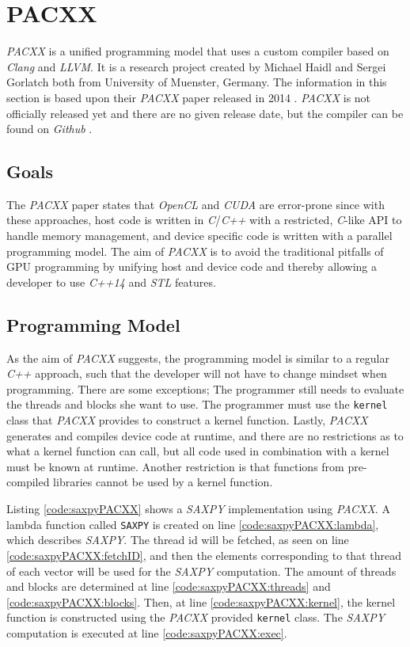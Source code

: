 \section{PACXX}
\textit{PACXX} is a unified programming model that uses a custom compiler based on \textit{Clang} and \textit{LLVM}. It is a research project created by Michael Haidl and Sergei Gorlatch both from University of Muenster, Germany. The information in this section is based upon their \textit{PACXX} paper released in 2014 \cite{pacxxPaper}. \textit{PACXX} is not officially released yet and there are no given release date, but the compiler can be found on \textit{Github} \cite{pacxxGithub}.

\subsection{Goals}
The \textit{PACXX} paper states that \textit{OpenCL} and \textit{CUDA} are error-prone since with these approaches, host code is written in \textit{C}/\textit{C++} with a restricted, \textit{C}-like API to handle memory management, and device specific code is written with a parallel programming model. The aim of \textit{PACXX} is to avoid the traditional pitfalls of GPU programming by unifying host and device code and thereby allowing a developer to use \textit{C++14} and \textit{STL} features.

\subsection{Programming Model}
As the aim of \textit{PACXX} suggests, the programming model is similar to a regular \textit{C++} approach, such that the developer will not have to change mindset when programming. There are some exceptions; The programmer still needs to evaluate the threads and blocks she want to use. The programmer must use the \texttt{kernel} class that \textit{PACXX} provides to construct a kernel function. Lastly, \textit{PACXX} generates and compiles device code at runtime, and there are no restrictions as to what a kernel function can call, but all code used in combination with a kernel must be known at runtime. Another restriction is that functions from pre-compiled libraries cannot be used by a kernel function.

Listing \ref{code:saxpyPACXX} shows a \textit{SAXPY} implementation using \textit{PACXX}. A lambda function called \texttt{SAXPY} is created on line \ref{code:saxpyPACXX:lambda}, which describes \textit{SAXPY}. The thread id will be fetched, as seen on line \ref{code:saxpyPACXX:fetchID}, and then the elements corresponding to that thread of each vector will be used for the \textit{SAXPY} computation. The amount of threads and blocks are determined at line \ref{code:saxpyPACXX:threads} and \ref{code:saxpyPACXX:blocks}. Then, at line \ref{code:saxpyPACXX:kernel}, the kernel function is constructed using the \textit{PACXX} provided \texttt{kernel} class. The \textit{SAXPY} computation is executed at line \ref{code:saxpyPACXX:exec}.

